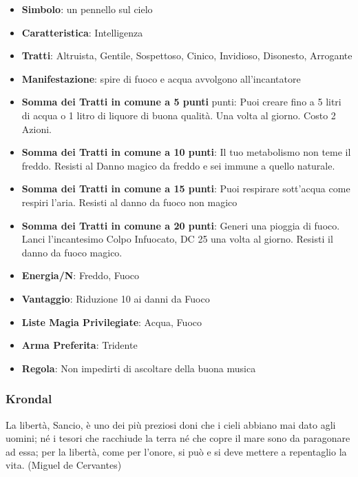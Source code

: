 \begin{multicols}{2}
\begin{itemize}[leftmargin=*] \setlength{\itemsep}{0pt}
\item \textbf{Simbolo}: un pennello sul cielo
\item \textbf{Caratteristica}: Intelligenza
\item \textbf{Tratti}: Altruista, Gentile, Sospettoso, Cinico, Invidioso, Disonesto, Arrogante
\item \textbf{Manifestazione}: spire di fuoco e acqua avvolgono all'incantatore
\item \textbf{Somma dei Tratti in comune a 5 punti} punti: Puoi creare fino a 5 litri di acqua o 1 litro di liquore di buona qualità. Una volta al giorno. Costo 2 Azioni.
\item \textbf{Somma dei Tratti in comune a 10 punti}: Il tuo metabolismo non teme il freddo. Resisti al Danno magico da freddo e sei immune a quello naturale.
\item \textbf{Somma dei Tratti in comune a 15 punti}: Puoi respirare sott'acqua come respiri l'aria. Resisti al danno da fuoco non magico
\item \textbf{Somma dei Tratti in comune a 20 punti}: Generi una pioggia di fuoco. Lanci l'incantesimo Colpo Infuocato, DC 25 una volta al giorno. Resisti il danno da fuoco magico.
\item \textbf{Energia/N}: Freddo, Fuoco
\item \textbf{Vantaggio}: Riduzione 10 ai danni da Fuoco
\item \textbf{Liste Magia Privilegiate}: Acqua, Fuoco
\item \textbf{Arma Preferita}: Tridente
\item \textbf{Regola}: Non impedirti di ascoltare della buona musica
\end{itemize}

\subsubsection{Krondal}\label{krondal}\hypertarget{krondal}{}

\begin{changemargin}{0.3cm}{0.3cm}\begin{enfasi}{
La libertà, Sancio, è uno dei più preziosi doni che i cieli abbiano mai dato agli uomini; né i tesori che racchiude la terra né che copre il mare sono da paragonare ad essa; per la libertà, come per l'onore, si può e si deve mettere a repentaglio la vita. (Miguel de Cervantes)
}\end{enfasi}\end{changemargin}\medskip


\end{multicols}
